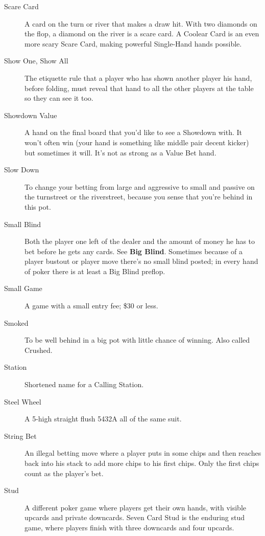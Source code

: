 \begin{description}
\item[Scare Card] A card on the turn or river that makes a draw hit.
With two diamonds on the flop, a diamond on the river is a scare card.
A Coolear Card is an even more scary Scare Card, making powerful
Single-Hand hands possible.

\item[Show One, Show All] The etiquette rule that a player who has
shown another player his hand, before folding, must reveal that hand
to all the other players at the table so they can see it too.

\item[Showdown Value] A hand on the final board that you'd like to see
a Showdown with. It won't often win (your hand is something like
middle pair decent kicker) but sometimes it will. It's not as strong
as a Value Bet hand.

\item[Slow Down] To change your betting from large and aggressive
to small and passive on the turnstreet or the riverstreet, because
you sense that you're behind in this pot.

\item[Small Blind] Both the player one left of the dealer and the
amount of money he has to bet before he gets any cards. See
\textbf{Big Blind}. Sometimes because of a player bustout or player
move there's no small blind posted; in every hand of poker there is at
least a Big Blind preflop.

\item[Small Game] A game with a small entry fee; \$30 or less.

\item[Smoked] To be well behind in a big pot with little chance of
winning. Also called Crushed.

\item[Station] Shortened name for a Calling Station.

\item[Steel Wheel] A 5-high straight flush 5432A all of the same suit.

\item[String Bet] An illegal betting move where a player puts in some
chips and then reaches back into his stack to add more chips to his
first chips. Only the first chips count as the player's bet.

\item[Stud] A different poker game where players get their own hands,
with visible upcards and private downcards. Seven Card Stud is the
enduring stud game, where players finish with three downcards and four
upcards.


\end{description}
